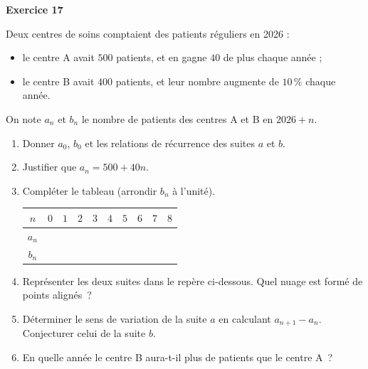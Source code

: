 \documentclass[a4paper,11pt]{article}
\newenvironment{exercice}[1]{%
  \Needspace{6\baselineskip}\par\bigskip\noindent\textbf{Exercice #1}\par\smallskip\noindent\ignorespaces
}{%
  \par
}
\newcommand{\grille}[4]{%
  \draw[very thin, gray!40, xstep=1, ystep=#4] (0,0) grid (#1,#2);
  \draw[->] (0,0) -- ({#1+0.5},0) node[right] {\small $n$};
  \draw[->] (0,0) -- (0,#2) -- ++(0,0.4cm);
  \foreach \x in {1,...,#1} \node[below] at (\x,0) {\scriptsize $\x$};
  \foreach \y in {#3} \node[left] at (0,\y) {\scriptsize $\y$};
  \node[below left] at (0,0) {\scriptsize $0$};
}
\begin{document}
\newpage
\begin{exercice}{17}
Deux centres de soins comptaient des patients réguliers en 2026 :
\begin{itemize}
\item le centre A avait $500$ patients, et en gagne $40$ de plus chaque année ;
\item le centre B avait $400$ patients, et leur nombre augmente de $10\,\%$ chaque année.
\end{itemize}
On note $a_n$ et $b_n$ le nombre de patients des centres A et B en $2026 + n$.
\begin{enumerate}[label=\arabic*.]
\item Donner $a_0$, $b_0$ et les relations de récurrence des suites $a$ et $b$.
\item Justifier que $a_n = 500 + 40n$.
\item Compléter le tableau (arrondir $b_n$ à l'unité).

\renewcommand{\arraystretch}{1.4}
\begin{tabular}{|c|*{9}{C{0.95cm}|}}
  \hline
  $n$ & $0$ & $1$ & $2$ & $3$ & $4$ & $5$ & $6$ & $7$ & $8$ \\
  \hline
  $a_n$ & & & & & & & & & \\
  \hline
  $b_n$ & & & & & & & & & \\
  \hline
\end{tabular}

\item Représenter les deux suites dans le repère ci-dessous. Quel nuage est formé de points alignés~?

\begin{center}
\end{center}

\item Déterminer le sens de variation de la suite $a$ en calculant $a_{n+1} - a_n$. Conjecturer celui de la suite $b$.
\item En quelle année le centre B aura-t-il plus de patients que le centre A~?
\end{enumerate}
\end{exercice}
\end{document}
